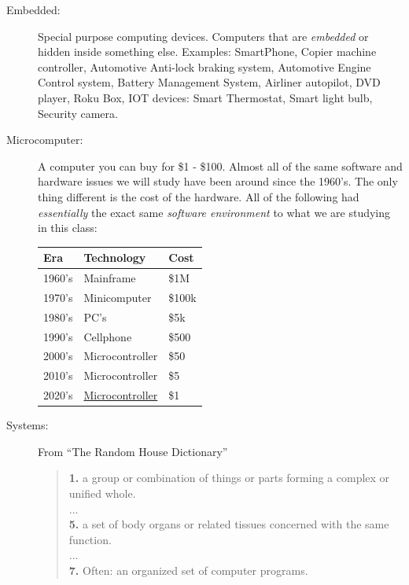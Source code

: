 \documentclass{article}	%
\begin{document}
\begin{description}

\item [Embedded:] Special purpose computing devices.
Computers that are {\it embedded} or hidden inside something
else.  Examples:  SmartPhone, Copier machine controller, Automotive Anti-lock
braking system, Automotive Engine Control system, Battery Management System, 
Airliner autopilot,  DVD player, Roku Box, IOT devices: Smart
Thermostat, Smart light bulb, Security camera.

\item [Microcomputer:] A computer you can buy for \$1 - \$100.
Almost all of the same software and hardware issues we will study
have been around since the 1960's.  The only thing different is
the cost of the hardware.  All of the following had {\it  essentially}
the exact same {\it software environment} to what we are studying in this class:


\begin{center}
\begin{tabular}{|l|l|l|}
\hline
Era             &       Technology        & Cost \\ \hline
1960's          &       Mainframe         & \$1M \\ \hline
1970's          &       Minicomputer      & \$100k \\ \hline
1980's          &       PC's              & \$5k   \\ \hline
1990's          &       Cellphone         & \$500  \\ \hline
2000's          &       Microcontroller   & \$50  \\ \hline
2010's          &       Microcontroller   & \$5   \\ \hline
2020's          &       \href{https://jaycarlson.net/microcontrollers/}{Microcontroller}   & \$1   \\ \hline
\end{tabular}
\end{center}



\item[Systems:]   From ``The Random House Dictionary'' \\
{\small\tt  \begin{quote} {\bf 1. } a group or combination of things or parts forming a complex or unified
  whole.\\
  ... \\
  {\bf 5. } a set of body organs or related tissues concerned with the same function.\\
  ...\\
  {\bf 7. } Often: an organized set of computer programs.
  \end{quote}
}

\end{description}
\end{document}
